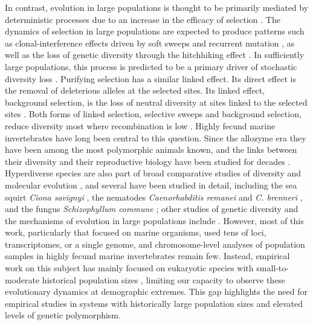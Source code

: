 In contrast, evolution in large populations is thought to be primarily mediated by
deterministic processes due to an increase in the efficacy of selection
\citep{charlesworth_effective_2009,gravel_when_2016,lanfear_population_2014}.
The dynamics of selection in large populations are expected to produce patterns
such as clonal-interference effects driven by soft sweeps and recurrent mutation
\citep{park_clonal_2007,weissman_rate_2014}, as well as the loss of genetic
diversity through the hitchhiking effect \citep{smith_hitch-hiking_1974}.
In sufficiently large populations, this process is predicted to be a primary driver
of stochastic diversity loss \citep{gillespie_genetic_2000,gillespie_role_1999}.
Purifying selection has a similar linked effect.
Its direct effect is the removal of deleterious alleles at the selected sites.
Its linked effect, background selection, is the loss of neutral diversity at sites
linked to the selected sites \citep{charlesworth_effect_1993}.
Both forms of linked selection, selective sweeps and background selection, reduce
diversity most where recombination is low \citep{begun_levels_1992}.
Highly fecund marine invertebrates have long been central to this question.
Since the allozyme era they have been among the most polymorphic animals known,
and the links between their diversity and their
reproductive biology have been studied for decades \citep{hedgecock_does_1994}.
Hyperdiverse species are also part of broad comparative studies of diversity and
molecular evolution \citep{romiguier_comparative_2014,galtier_adaptive_2016,
galtier_codon_2018}, and several have been studied in detail, including the sea squirt
\textit{Ciona savignyi} \citep{small_extreme_2007}, the nematodes
\textit{Caenorhabditis remanei} and \textit{C. brenneri}
\citep{cutter_high_2006,dey_molecular_2013}, and the fungus \textit{Schizophyllum commune}
\citep{baranova_extraordinary_2015}; other studies of genetic diversity and the
mechanisms of evolution in large populations include
\citet{ag1000g,teterina_pervasive_2025,anderson_population_2017,braso-vives_highly_2026}.
However, most of this work, particularly that focused on marine organisms,
 used tens of loci, transcriptomes, or a single genome, and
chromosome-level analyses of population samples in highly fecund marine invertebrates
remain few.
Instead, empirical work on this subject has mainly focused on eukaryotic species with
small-to-moderate historical population sizes \citep{cutter_molecular_2013,
leffler_revisiting_2012,buffalo_quantifying_2021}, limiting our capacity to observe
these evolutionary dynamics at demographic extremes.
This gap highlights the need for empirical studies in systems with historically large
population sizes and elevated levels of genetic polymorphism.
\vspace{0.1cm}

